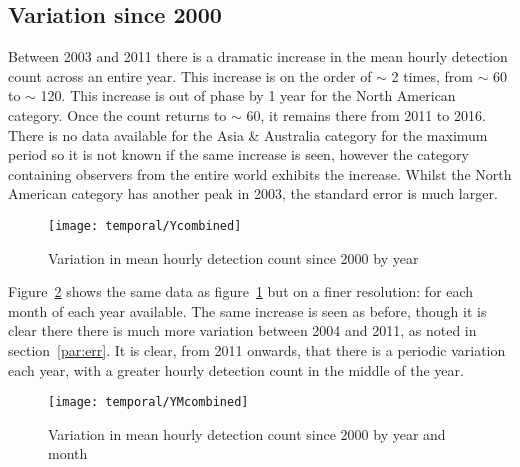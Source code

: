 \subsection{Variation since 2000}
Between 2003 and 2011 there is a dramatic increase in the mean hourly detection count across an entire year. This increase is on the order of $\sim$ 2 times, from $\sim$ 60 to $\sim$ 120. This increase is out of phase by 1 year for the North American category. Once the count returns to $\sim$ 60, it remains there from 2011 to 2016. There is no data available for the Asia \& Australia category for the maximum period so it is not known if the same increase is seen, however the category containing observers from the entire world exhibits the increase. Whilst the North American category has another peak in 2003, the standard error is much larger.
\begin{figure}[h!]
	\centering
	\texttt{[image: temporal/Ycombined]}
	\caption{Variation in mean hourly detection count since 2000 by year
		\label{fig:temp:year}}
\end{figure}
Figure~\ref{fig:temp:yearmonth} shows the same data as figure~\ref{fig:temp:year} but on a finer resolution: for each month of each year available. The same increase is seen as before, though it is clear there there is much more variation between 2004 and 2011, as noted in section~\ref{par:err}. It is clear, from 2011 onwards, that there is a periodic variation each year, with a greater hourly detection count in the middle of the year.
\begin{figure}[h!]
	\centering
	\texttt{[image: temporal/YMcombined]}
	\caption{Variation in mean hourly detection count since 2000 by year and month
		\label{fig:temp:yearmonth}}
\end{figure}
